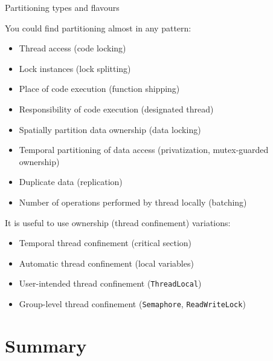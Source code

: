 \begin{frame}{Partitioning types and flavours}

You could find partitioning almost in any pattern:
\begin{itemize}
    \item Thread access (code locking)
    \item Lock instances (lock splitting)
    \item Place of code execution (function shipping)
    \item Responsibility of code execution (designated thread)
    \item Spatially partition data ownership (data locking)
    \item Temporal partitioning of data access (privatization, mutex-guarded ownership)
    \item Duplicate data (replication)
    \item Number of operations performed by thread locally (batching)
\end{itemize}

\pause
It is useful to use ownership (thread confinement) variations:
\begin{itemize}
    \item Temporal thread confinement (critical section)
    \item Automatic thread confinement (local variables)
    \item User-intended thread confinement (\texttt{ThreadLocal})
    \item Group-level thread confinement (\texttt{Semaphore}, \texttt{ReadWriteLock})
\end{itemize}
\end{frame}

\section{Summary}

